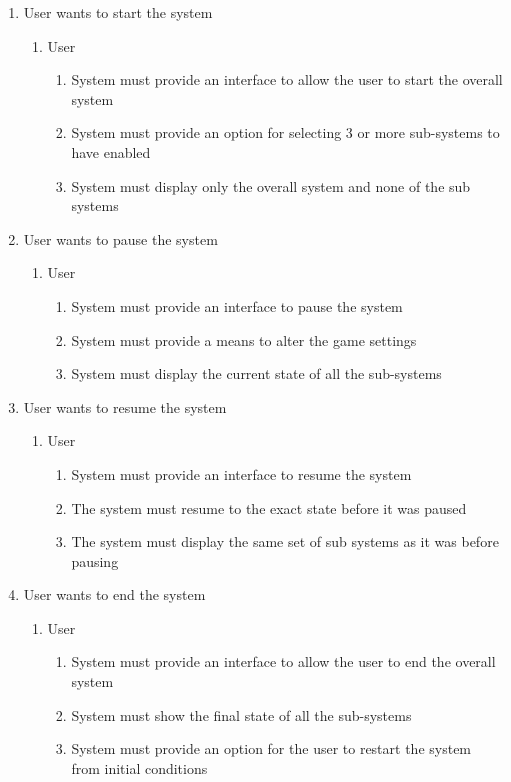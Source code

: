 \documentclass[12pt, titlepage]{article}
\begin{document}
\begin{enumerate}[{BE}1.]
	\item User wants to start the system
	\begin{enumerate}[{VP5}.1]
		\item User
			\begin{enumerate}
				\item System must provide an interface to allow the user to start the overall system
				\item System must provide an option for selecting 3 or more sub-systems to have enabled
				\item System must display only the overall system and none of the sub systems
			\end{enumerate}
	\end{enumerate}
	
	\item User wants to pause the system
	\begin{enumerate}[{VP6}.1]
		\item User
			\begin{enumerate}
				\item System must provide an interface to pause the system
				\item System must provide a means to alter the game settings
				\item System must display the current state of all the sub-systems
			\end{enumerate}
	\end{enumerate}
	
	\item User wants to resume the system
	\begin{enumerate}[{VP7}.1]
		\item User
			\begin{enumerate}
				\item System must provide an interface to resume the system
				\item The system must resume to the exact state before it was paused
				\item The system must display the same set of sub systems as it was before pausing
			\end{enumerate}
	\end{enumerate}
	
	\item User wants to end the system
	\begin{enumerate}[{VP8}.1]
		\item User
			\begin{enumerate}
				\item System must provide an interface to allow the user to end the overall system
				\item System must show the final state of all the sub-systems
				\item System must provide an option for the user to restart the system from initial conditions
			\end{enumerate}
	\end{enumerate}
	

\end{enumerate}
\end{document}
